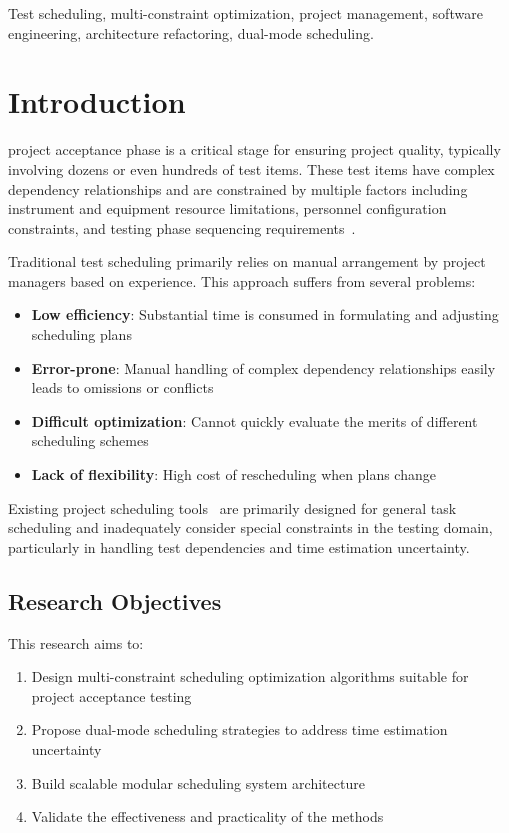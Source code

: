 \documentclass[journal]{IEEEtran}
\begin{document}
\begin{IEEEkeywords}
Test scheduling, multi-constraint optimization, project management, software engineering, architecture refactoring, dual-mode scheduling.
\end{IEEEkeywords}

\IEEEpeerreviewmaketitle

\section{Introduction}
 project acceptance phase is a critical stage for ensuring project quality, typically involving dozens or even hundreds of test items. These test items have complex dependency relationships and are constrained by multiple factors including instrument and equipment resource limitations, personnel configuration constraints, and testing phase sequencing requirements~\cite{ref1,ref2}.

Traditional test scheduling primarily relies on manual arrangement by project managers based on experience. This approach suffers from several problems:
\begin{itemize}
\item \textbf{Low efficiency}: Substantial time is consumed in formulating and adjusting scheduling plans
\item \textbf{Error-prone}: Manual handling of complex dependency relationships easily leads to omissions or conflicts  
\item \textbf{Difficult optimization}: Cannot quickly evaluate the merits of different scheduling schemes
\item \textbf{Lack of flexibility}: High cost of rescheduling when plans change
\end{itemize}

Existing project scheduling tools~\cite{ref3,ref4} are primarily designed for general task scheduling and inadequately consider special constraints in the testing domain, particularly in handling test dependencies and time estimation uncertainty.

\subsection{Research Objectives}
This research aims to:
\begin{enumerate}
\item Design multi-constraint scheduling optimization algorithms suitable for project acceptance testing
\item Propose dual-mode scheduling strategies to address time estimation uncertainty
\item Build scalable modular scheduling system architecture
\item Validate the effectiveness and practicality of the methods
\end{enumerate}
\end{document}
